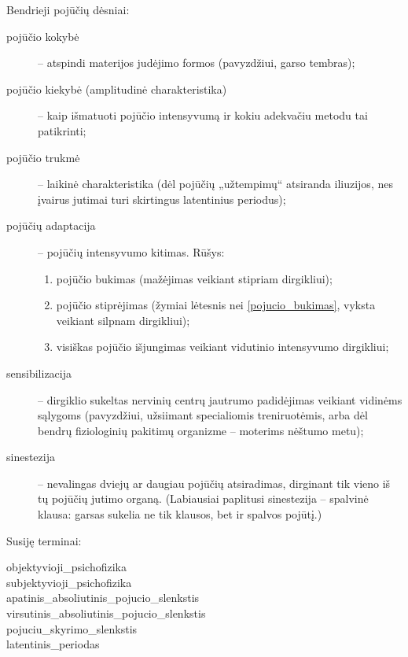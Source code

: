 Bendrieji pojūčių dėsniai:
\begin{description}
  \item[pojūčio kokybė] – atspindi materijos judėjimo formos (pavyzdžiui,
    garso tembras);
  \item[pojūčio kiekybė (amplitudinė charakteristika)] – kaip išmatuoti
    pojūčio intensyvumą ir kokiu adekvačiu metodu tai patikrinti;
  \item[pojūčio trukmė] – laikinė charakteristika (dėl pojūčių „užtempimų“
    atsiranda iliuzijos, nes įvairus jutimai turi skirtingus latentinius
    periodus);
  \item[pojūčių adaptacija] – pojūčių intensyvumo kitimas. Rūšys:
    \begin{enumerate}
      \item \label{pojucio_bukimas} pojūčio bukimas (mažėjimas veikiant 
        stipriam dirgikliui);
      \item pojūčio stiprėjimas (žymiai lėtesnis nei \ref{pojucio_bukimas},
        vyksta veikiant silpnam dirgikliui);
      \item visiškas pojūčio išjungimas veikiant vidutinio intensyvumo
        dirgikliui;
    \end{enumerate}
  \item[sensibilizacija] – dirgiklio sukeltas nervinių centrų jautrumo
    padidėjimas veikiant vidinėms sąlygoms (pavyzdžiui, užsiimant 
    specialiomis treniruotėmis, arba dėl bendrų fiziologinių pakitimų
    organizme – moterims nėštumo metu);
  \item[sinestezija] – nevalingas dviejų ar daugiau pojūčių atsiradimas,
    dirginant tik vieno iš tų pojūčių jutimo organą. (Labiausiai 
    paplitusi sinestezija – spalvinė klausa: garsas sukelia ne tik
    klausos, bet ir spalvos pojūtį.)
\end{description}

Susiję terminai:

\begin{description}
  \item[\Gls{objektyvioji_psichofizika}] 
  \item[\Gls{subjektyvioji_psichofizika}] 
  \item[\Gls{apatinis_absoliutinis_pojucio_slenkstis}] 
  \item[\Gls{virsutinis_absoliutinis_pojucio_slenkstis}] 
  \item[\Gls{pojuciu_skyrimo_slenkstis}] 
  \item[\Gls{latentinis_periodas}] 
\end{description}

